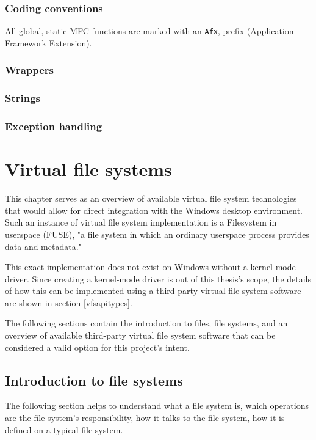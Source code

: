 \subsubsection{Coding conventions}
All global, static MFC functions are marked with an \lstinline{Afx}, prefix (Application Framework Extension). 

\subsubsection{Wrappers}

\subsubsection{Strings}

\subsubsection{Exception handling}


\section{Virtual file systems}
This chapter serves as an overview of available virtual file system technologies that would allow for direct integration with the Windows desktop environment. Such an instance of virtual file system implementation is a Filesystem in userspace (FUSE), "a file system in which an ordinary userspace process provides data and metadata."\cite{FUSE}

This exact implementation does not exist on Windows without a kernel-mode driver\cite{WinKernelFS}. Since creating a kernel-mode driver is out of this thesis's scope, the details of how this can be implemented using a third-party virtual file system software are shown in section \ref{vfsapitypes}.

The following sections contain the introduction to files, file systems, and an overview of available third-party virtual file system software that can be considered a valid option for this project's intent.

\subsection{Introduction to file systems}
The following section helps to understand what a file system is, which operations are the file system's responsibility, how it talks to the file system, how it is defined on a typical file system.

